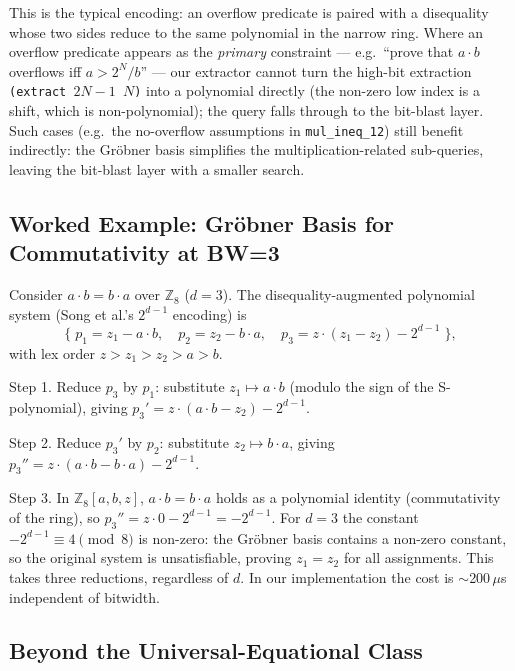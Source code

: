 \documentclass[runningheads]{llncs}
\begin{document}
This is the typical encoding: an overflow predicate is paired with a
disequality whose two sides reduce to the same polynomial in the
narrow ring. Where an overflow predicate appears as the \emph{primary}
constraint --- e.g.\ ``prove that $a\cdot b$ overflows iff
$a > 2^N / b$'' --- our extractor cannot turn the high-bit extraction
\texttt{(extract $2N{-}1$ $N$)} into a polynomial directly (the
non-zero low index is a shift, which is non-polynomial); the query
falls through to the bit-blast layer. Such cases (e.g.\ the
no-overflow assumptions in \texttt{mul\_ineq\_12}) still benefit
indirectly: the Gr\"obner basis simplifies the multiplication-related
sub-queries, leaving the bit-blast layer with a smaller search.

\subsection{Worked Example: Gr\"obner Basis for Commutativity at BW=3}
\label{sec:grobner-example}

Consider $a \cdot b = b \cdot a$ over $\mathbb{Z}_8$ ($d = 3$).
The disequality-augmented polynomial system (Song et al.'s
$2^{d-1}$ encoding) is
\[
  \{\; p_1 = z_1 - a \cdot b, \quad
       p_2 = z_2 - b \cdot a, \quad
       p_3 = z \cdot (z_1 - z_2) - 2^{d-1} \;\},
\]
with lex order $z > z_1 > z_2 > a > b$.

Step 1. Reduce $p_3$ by $p_1$: substitute $z_1 \mapsto a \cdot b$
(modulo the sign of the S-polynomial), giving
$p_3' = z \cdot (a \cdot b - z_2) - 2^{d-1}$.

Step 2. Reduce $p_3'$ by $p_2$: substitute $z_2 \mapsto b \cdot a$,
giving $p_3'' = z \cdot (a \cdot b - b \cdot a) - 2^{d-1}$.

Step 3. In $\mathbb{Z}_8[a, b, z]$, $a \cdot b = b \cdot a$ holds as
a polynomial identity (commutativity of the ring), so
$p_3'' = z \cdot 0 - 2^{d-1} = -2^{d-1}$. For $d = 3$ the constant
$-2^{d-1} \equiv 4 \pmod 8$ is non-zero: the Gr\"obner basis
contains a non-zero constant, so the original system is
unsatisfiable, proving $z_1 = z_2$ for all
assignments. This takes three reductions, regardless of $d$. In
our implementation the cost is ${\sim}$200\,$\mu$s independent of
bitwidth.

\subsection{Beyond the Universal-Equational Class}
\label{sec:future-within-and-beyond}
\end{document}
